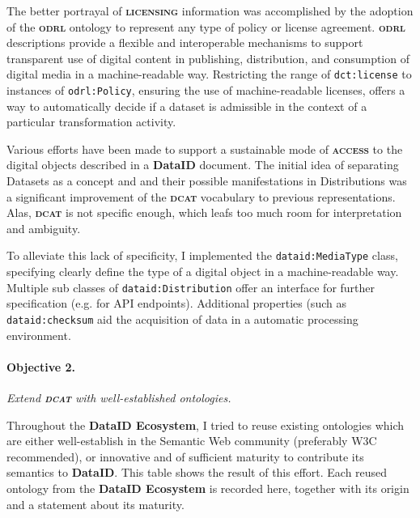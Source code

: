 \documentclass[a4paper,english,twoside,BCOR1.5cm,headsepline,DIV12,appendixprefix,final,12pt]{scrbook}
\newcommand{\licensing}{{\ttfamily\scshape\bfseries licensing}\xspace}
\newcommand{\access}{{\ttfamily\scshape\bfseries access}\xspace}
\newcommand{\ecosystem}{{\ttfamily\bfseries DataID Ecosystem}\xspace}
\newcommand{\dataid}{{\ttfamily\bfseries DataID}\xspace}
\newcommand{\odrl}{{\scshape\bfseries odrl}\xspace}
\newcommand{\dcat}{{\scshape\bfseries dcat}\xspace}
\newcommand{\prop}[1]{{{\texttt{#1}}}}
\begin{document}
The better portrayal of \licensing information was accomplished by the adoption of the \odrl ontology to represent any type of policy or license agreement. \odrl descriptions provide a flexible and interoperable mechanisms to support transparent use of digital content in publishing, distribution, and consumption of digital media in a machine-readable way. Restricting the range of \prop{dct:license} to instances of \prop{odrl:Policy}, ensuring the use of machine-readable licenses, offers a way to automatically decide if a dataset is admissible in the context of a particular transformation activity.

Various efforts have been made to support a sustainable mode of \access to the digital objects described in a \dataid document. The initial idea of separating Datasets as a concept and and their possible manifestations in Distributions was a significant improvement of the \dcat vocabulary to previous representations. Alas, \dcat is not specific enough, which leafs too much room for interpretation and ambiguity.

To alleviate this lack of specificity, I implemented the \prop{dataid:MediaType} class, specifying clearly define the type of a digital object in a machine-readable way. Multiple sub classes of \prop{dataid:Distribution} offer an interface for further specification (e.g. for API endpoints). Additional properties (such as \prop{dataid:checksum} aid the acquisition of data in a automatic processing environment.

\paragraph{Objective 2.} \textit{Extend \dcat with well-established ontologies.}

Throughout the \ecosystem, I tried to reuse existing ontologies which are either well-establish in the Semantic Web community (preferably W3C recommended), or innovative and of sufficient maturity to contribute its semantics to \dataid.
This table shows the result of this effort. Each reused ontology from the \ecosystem is recorded here, together with its origin and a statement about its maturity.
\end{document}
